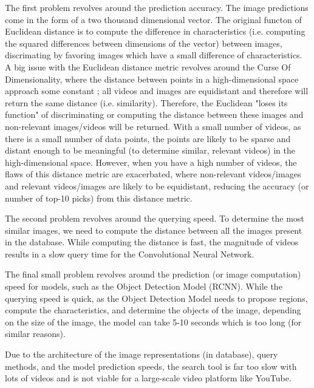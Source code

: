 \documentclass[10pt,twocolumn]{article}
\begin{document}
The first problem revolves around the prediction accuracy. The image predictions come in the form of a two thousand dimensional vector. The original functon of Euclidean distance is to compute the difference in characteristics (i.e. computing the squared differences between dimensions of the vector) between images, discrimating by favoring images which have a small difference of characteristics. A big issue with the Euclidean distance metric revolves around the Curse Of Dimensionality, where the distance between points in a high-dimensional space approach some constant \cite{WikipediaCurseDimension}; all videos and images are equidistant and therefore will return the same distance (i.e. similarity). Therefore, the Euclidean "loses its function" \cite{WikipediaCurseDimension} of discriminating or computing the distance between these images and non-relevant images/videos will be returned. With a small number of videos, as there is a small number of data points, the points are likely to be sparse and distant enough to be meaningful (to determine similar, relevant videos) in the high-dimensional space. However, when you have a high number of videos, the flaws of this distance metric are exacerbated, where non-relevant videos/images and relevant videos/images are likely to be equidistant, reducing the accuracy (or number of top-10 picks) from this distance metric.

The second problem revolves around the querying speed. To determine the most similar images, we need to compute the distance between all the images present in the database. While computing the distance is fast, the magnitude of videos results in a slow query time for the Convolutional Neural Network.

The final small problem revolves around the prediction (or image computation) speed for models, such as the Object Detection Model (RCNN). While the querying speed is quick, as the Object Detection Model needs to propose regions, compute the characteristics, and determine the objects of the image, depending on the size of the image, the model can take 5-10 seconds which is too long (for similar reasons).

Due to the architecture of the image representations (in database), query methods, and the model prediction speeds, the search tool is far too slow with lots of videos and is not viable for a large-scale video platform like YouTube.
\end{document}
